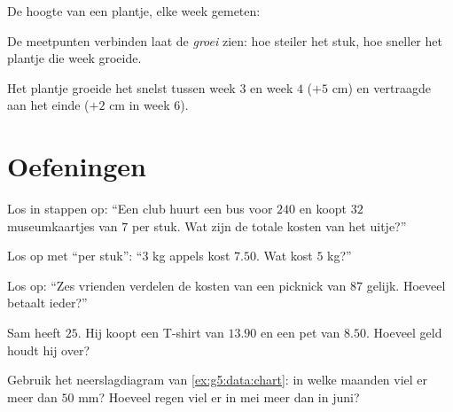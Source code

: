 \begin{example}\label{ex:g5:data:line}
De hoogte van een plantje, elke week gemeten:

\begin{omfigure}

{\small De meetpunten verbinden laat de \emph{groei} zien: hoe steiler het
stuk, hoe sneller het plantje die week groeide.}
\end{omfigure}

Het plantje groeide het snelst tussen week $3$ en week $4$ ($+5$ cm) en
vertraagde aan het einde ($+2$ cm in week $6$).
\end{example}

\section{Oefeningen}

\begin{exercise}[$\star$]\label{exo:g5:data:1}
Los in stappen op: ``Een club huurt een bus voor $240$ en koopt $32$
museumkaartjes van $7$ per stuk. Wat zijn de totale kosten van het uitje?''
\end{exercise}

\begin{exercise}[$\star$]\label{exo:g5:data:2}
Los op met ``per stuk'': ``$3$ kg appels kost $7.50$. Wat kost $5$ kg?''
\end{exercise}

\begin{exercise}[$\star$]\label{exo:g5:data:3}
Los op: ``Zes vrienden verdelen de kosten van een picknick van $87$ gelijk.
Hoeveel betaalt ieder?''
\end{exercise}

\begin{exercise}[$\star$]\label{exo:g5:data:4}
Sam heeft $25$. Hij koopt een T-shirt van $13.90$ en een pet van $8.50$.
Hoeveel geld houdt hij over?
\end{exercise}

\begin{exercise}[$\star$]\label{exo:g5:data:5}
Gebruik het neerslagdiagram van \cref{ex:g5:data:chart}: in welke maanden viel
er meer dan $50$ mm? Hoeveel regen viel er in mei meer dan in juni?
\end{exercise}

